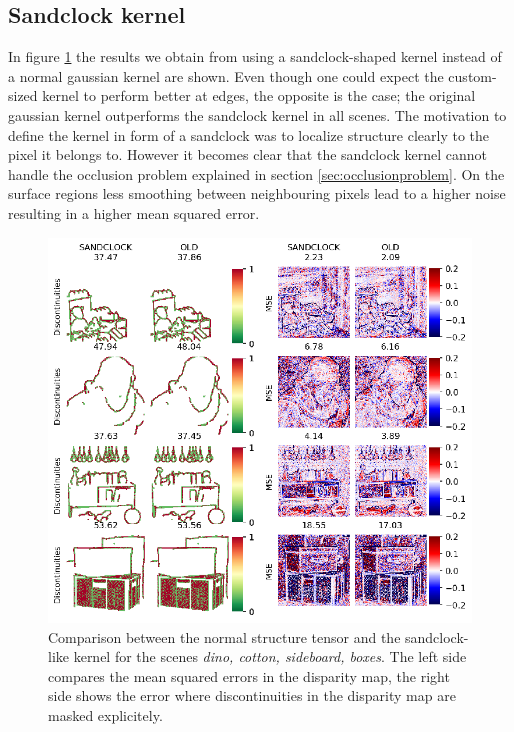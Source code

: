 \documentclass  [
  paper    = a4,
  BCOR     = 10mm,
  twoside,
  fontsize = 12pt,
  fleqn,
  toc      = bibnumbered,
  toc      = listofnumbered,
  numbers  = noendperiod,
  headings = normal,
  listof   = leveldown,
  version  = 3.03
]                                       {scrreprt}
\begin{document}
\subsection{Sandclock kernel}
In figure \ref{fig:sandclockresults} the results we obtain from using a sandclock-shaped kernel instead of a normal gaussian kernel are shown. Even though one could expect the custom-sized kernel to perform better at edges, the opposite is the case; the original gaussian kernel outperforms the sandclock kernel in all scenes. The motivation to define the kernel in form of a sandclock was to localize structure clearly to the pixel it belongs to. However it becomes clear that the sandclock kernel cannot handle the occlusion problem explained in section \ref{sec:occlusionproblem}. On the surface regions less smoothing between neighbouring pixels lead to a higher noise resulting in a higher mean squared error. 
\begin{figure}
	\centering
	\includegraphics[width=0.7\linewidth]{images/sandclock_results}
	\caption[Results with custom sized kernel]{Comparison between the normal structure tensor and the sandclock- like kernel for the scenes \textit{dino, cotton, sideboard, boxes}. The left side compares the mean squared errors in the disparity map, the right side shows the error where discontinuities in the disparity map are masked explicitely.}
	\label{fig:sandclockresults}
\end{figure}
\end{document}
